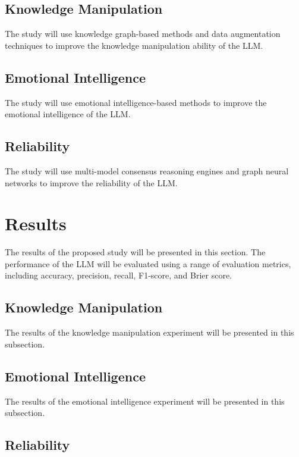 \documentclass{article}
\begin{document}
\subsection{Knowledge Manipulation}

The study will use knowledge graph-based methods and data augmentation techniques to improve the knowledge manipulation ability of the LLM.

\subsection{Emotional Intelligence}

The study will use emotional intelligence-based methods to improve the emotional intelligence of the LLM.

\subsection{Reliability}

The study will use multi-model consensus reasoning engines and graph neural networks to improve the reliability of the LLM.

\section{Results}

The results of the proposed study will be presented in this section. The performance of the LLM will be evaluated using a range of evaluation metrics, including accuracy, precision, recall, F1-score, and Brier score.

\subsection{Knowledge Manipulation}

The results of the knowledge manipulation experiment will be presented in this subsection.

\subsection{Emotional Intelligence}

The results of the emotional intelligence experiment will be presented in this subsection.

\subsection{Reliability}
\end{document}
